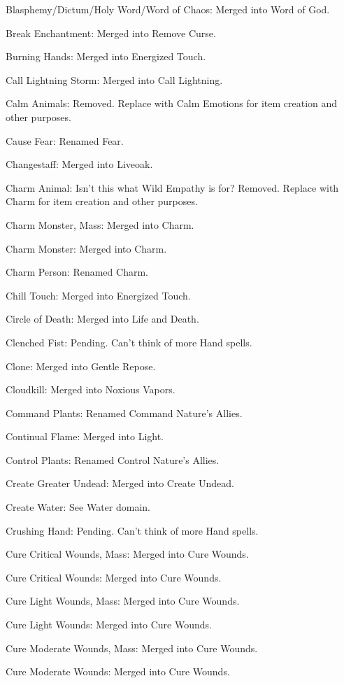 {\begin{list}{}{\leftmargin=1em}
 \item Blasphemy/Dictum/Holy Word/Word of Chaos: Merged into Word of God.
 \item Break Enchantment: Merged into Remove Curse.
 \item Burning Hands: Merged into Energized Touch.
 \item Call Lightning Storm: Merged into Call Lightning.
 \item Calm Animals: Removed. Replace with Calm Emotions for item creation and other purposes.
 \item Cause Fear: Renamed Fear.
 \item Changestaff: Merged into Liveoak.
 \item Charm Animal: Isn't this what Wild Empathy is for? Removed. Replace with Charm for item creation and other purposes.
 \item Charm Monster, Mass: Merged into Charm.
 \item Charm Monster: Merged into Charm.
 \item Charm Person: Renamed Charm.
 \item Chill Touch: Merged into Energized Touch.
 \item Circle of Death: Merged into Life and Death.
 \item Clenched Fist: Pending. Can't think of more Hand spells.
 \item Clone: Merged into Gentle Repose.
 \item Cloudkill: Merged into Noxious Vapors.
 \item Command Plants: Renamed Command Nature's Allies.
 \item Continual Flame: Merged into Light.
 \item Control Plants: Renamed Control Nature's Allies.
 \item Create Greater Undead: Merged into Create Undead.
 \item Create Water: See Water domain.
 \item Crushing Hand: Pending. Can't think of more Hand spells.
 \item Cure Critical Wounds, Mass: Merged into Cure Wounds.
 \item Cure Critical Wounds: Merged into Cure Wounds.
 \item Cure Light Wounds, Mass: Merged into Cure Wounds.
 \item Cure Light Wounds: Merged into Cure Wounds.
 \item Cure Moderate Wounds, Mass: Merged into Cure Wounds.
 \item Cure Moderate Wounds: Merged into Cure Wounds.

\end{list}}
